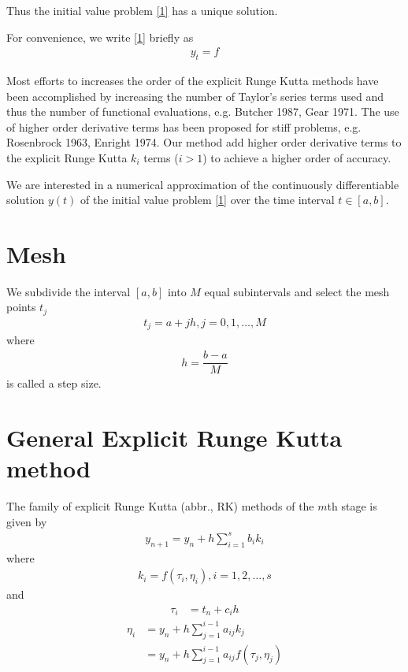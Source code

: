 \documentclass[a4paper,oneside]{book}
\numberwithin{equation}{chapter}
\begin{document}
Thus the initial value problem \eqref{1} has a unique solution.

For convenience, we write \eqref{1} briefly as
\begin{align}
y_t=f
\end{align}

Most efforts to increases the order of the explicit Runge Kutta methods have been accomplished by increasing the number of Taylor's series terms used and thus the number of functional evaluations, e.g. Butcher 1987, Gear 1971. The use of higher order derivative terms has been proposed for stiff problems, e.g. Rosenbrock 1963, Enright 1974. Our method add higher order derivative terms to the explicit Runge Kutta $k_i$ terms ($i>1$) to achieve a higher order of accuracy. 

We are interested in a numerical approximation of the continuously differentiable solution $y\left( t\right)$ of the initial value problem \eqref{1} over the time interval $t \in \left[ a,b\right]$.
\section{Mesh}
We subdivide the interval $\left[ {a,b} \right]$ into $M$ equal subintervals and select the mesh points $t_j$
\begin{align}
{t_j} = a + jh,j = 0,1, \ldots ,M
\end{align}
where
\begin{align}
h = \dfrac{{b - a}}{M}
\end{align}
is called a step size.
\section{General Explicit Runge Kutta method}
The family of explicit Runge Kutta (abbr., RK) methods of the $m$th stage is given by
\begin{align}
\label{1.8}
{{y_{n + 1}}} = {{y_n}} + h\sum\limits_{i = 1}^s {{b_i}{k_i}} 
\end{align}
where
\begin{align}
\label{1.9}
{k_i} = f\left( {{\tau _i},{\eta _i}} \right),i = 1,2, \ldots ,s
\end{align}
and
\begin{align}
{\tau _i} &= {t_n} + {c_i}h
\end{align}
\begin{align}
{\eta _i} &= {y_n} + h\sum\limits_{j = 1}^{i - 1} {{a_{ij}}{k_j}} \\
 &= {y_n} + h\sum\limits_{j = 1}^{i - 1} {{a_{ij}}f\left( {{\tau _j},{\eta _j}} \right)} 
\end{align}
\end{document}
